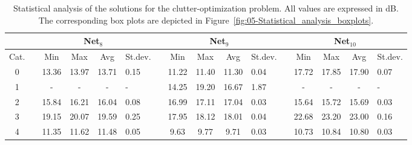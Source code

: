 \begin{table}
\centering

\caption{Statistical analysis of the solutions for the clutter-optimization
problem. All values are expressed in dB. The corresponding box plots
are depicted in Figure~\ref{fig:05-Statistical_analysis_boxplots}.
\label{tab:05-Statistical_analysis_of_solutions}}


{\scriptsize{}}%
\begin{tabular}{ccccc>{\centering}p{0.75cm}cccc>{\centering}p{0.75cm}cccc>{\centering}p{0.75cm}}
\cline{3-16} 
 &  &  & \multicolumn{2}{c}{{\scriptsize{Net$_{8}$}}} &  &  &  & \multicolumn{2}{c}{{\scriptsize{Net$_{9}$}}} &  &  &  & \multicolumn{2}{c}{{\scriptsize{Net$_{10}$}}} & \tabularnewline
\hline 
{\scriptsize{Cat.}} &  & {\scriptsize{Min}} & {\scriptsize{Max}} & {\scriptsize{Avg}} & {\scriptsize{St.dev.}} &  & {\scriptsize{Min}} & {\scriptsize{Max}} & {\scriptsize{Avg}} & {\scriptsize{St.dev.}} &  & {\scriptsize{Min}} & {\scriptsize{Max}} & {\scriptsize{Avg}} & {\scriptsize{St.dev.}}\tabularnewline
\hline 
{\scriptsize{0}} &  & {\scriptsize{13.36}} & {\scriptsize{13.97}} & {\scriptsize{13.71}} & {\scriptsize{0.15}} &  & {\scriptsize{11.22}} & {\scriptsize{11.40}} & {\scriptsize{11.30}} & {\scriptsize{0.04}} &  & {\scriptsize{17.72}} & {\scriptsize{17.85}} & {\scriptsize{17.90}} & {\scriptsize{0.07}}\tabularnewline
\cline{1-6} \cline{8-11} \cline{13-16} 
{\scriptsize{1}} &  & {\scriptsize{-}} & {\scriptsize{-}} & {\scriptsize{-}} & {\scriptsize{-}} &  & {\scriptsize{14.25}} & {\scriptsize{19.20}} & {\scriptsize{16.67}} & {\scriptsize{1.87}} &  & {\scriptsize{-}} & {\scriptsize{-}} & {\scriptsize{-}} & {\scriptsize{-}}\tabularnewline
\cline{1-6} \cline{8-11} \cline{13-16} 
{\scriptsize{2}} &  & {\scriptsize{15.84}} & {\scriptsize{16.21}} & {\scriptsize{16.04}} & {\scriptsize{0.08}} &  & {\scriptsize{16.99}} & {\scriptsize{17.11}} & {\scriptsize{17.04}} & {\scriptsize{0.03}} &  & {\scriptsize{15.64}} & {\scriptsize{15.72}} & {\scriptsize{15.69}} & {\scriptsize{0.03}}\tabularnewline
\cline{1-6} \cline{8-11} \cline{13-16} 
{\scriptsize{3}} &  & {\scriptsize{19.15}} & {\scriptsize{20.07}} & {\scriptsize{19.59}} & {\scriptsize{0.25}} &  & {\scriptsize{17.95}} & {\scriptsize{18.12}} & {\scriptsize{18.01}} & {\scriptsize{0.04}} &  & {\scriptsize{22.68}} & {\scriptsize{23.20}} & {\scriptsize{23.00}} & {\scriptsize{0.16}}\tabularnewline
\cline{1-6} \cline{8-11} \cline{13-16} 
{\scriptsize{4}} &  & {\scriptsize{11.35}} & {\scriptsize{11.62}} & {\scriptsize{11.48}} & {\scriptsize{0.05}} &  & {\scriptsize{9.63}} & {\scriptsize{9.77}} & {\scriptsize{9.71}} & {\scriptsize{0.03}} &  & {\scriptsize{10.73}} & {\scriptsize{10.84}} & {\scriptsize{10.80}} & {\scriptsize{0.03}}\tabularnewline

\end{tabular}
\end{table}
